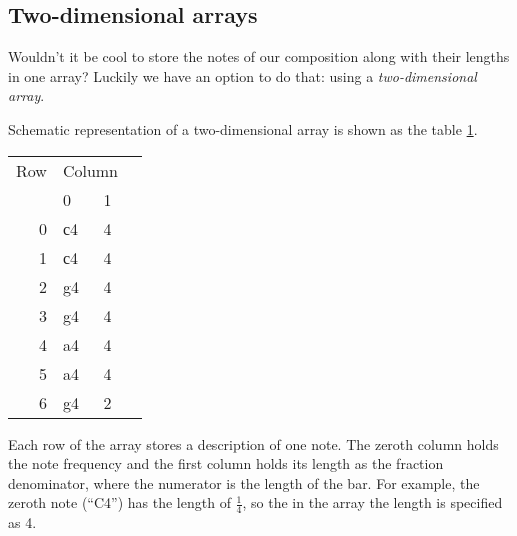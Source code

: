 \documentclass[../sparc.tex]{subfiles}
\begin{document}
\newpage
\subsection{Two-dimensional arrays}

Wouldn't it be cool to store the notes of our composition along with their
lengths in one array?  Luckily we have an option to do that: using a
\emph{two-dimensional array}.

Schematic representation of a two-dimensional array is shown as the table
\ref{table:array-example-2}.

\begin{table}[ht]
  \centering
  \begin{tabular}{r|l|l|l}
    \multicolumn{1}{l}{Row} & \multicolumn{2}{l}{Column}                         &   \\
    \multicolumn{1}{l}{}         & \multicolumn{1}{l}{0} & \multicolumn{1}{l}{1} &   \\
    \cline{2-3}
    0                            & с4                    & 4                     &   \\
    \cline{2-3}
    1                            & с4                    & 4                     &   \\
    \cline{2-3}
    2                            & g4                    & 4                     &   \\
    \cline{2-3}
    3                            & g4                    & 4                     &   \\
    \cline{2-3}
    4                            & a4                    & 4                     &   \\
    \cline{2-3}
    5                            & a4                    & 4                     &   \\
    \cline{2-3}
    6                            & g4                    & 2                     &   \\
    \cline{2-3}
  \end{tabular}
  \label{table:array-example-2}
\end{table}

Each row of the array stores a description of one note.  The zeroth column holds
the note frequency and the first column holds its length as the fraction
denominator, where the numerator is the length of the bar.  For example, the
zeroth note (``C4'') has the length of $\frac{1}{4}$, so the in the array the
length is specified as 4.
\end{document}
